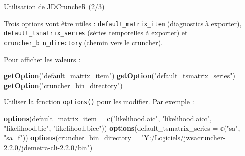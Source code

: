 \documentclass[10pt,xcolor=table,color={dvipsnames,usenames},ignorenonframetext,usepdftitle=false,french]{beamer}
\newenvironment{Shaded}{\begin{snugshade}}{\end{snugshade}}
\newcommand{\DataTypeTok}[1]{\textcolor[rgb]{0.13,0.29,0.53}{#1}}
\newcommand{\KeywordTok}[1]{\textcolor[rgb]{0.13,0.29,0.53}{\textbf{#1}}}
\newcommand{\NormalTok}[1]{#1}
\newcommand{\StringTok}[1]{\textcolor[rgb]{0.31,0.60,0.02}{#1}}
\begin{document}
\begin{frame}[fragile]{Utilisation de JDCruncheR (2/3)}
\protect\hypertarget{utilisation-de-jdcruncher-23}{}

Trois options vont être utiles : \texttt{default\_matrix\_item}
(diagnostics à exporter), \texttt{default\_tsmatrix\_series} (séries
temporelles à exporter) et \texttt{cruncher\_bin\_directory} (chemin
vers le cruncher).

Pour afficher les valeurs :

\begin{Shaded}
\begin{Highlighting}[]
\KeywordTok{getOption}\NormalTok{(}\StringTok{"default_matrix_item"}\NormalTok{)}
\KeywordTok{getOption}\NormalTok{(}\StringTok{"default_tsmatrix_series"}\NormalTok{)}
\KeywordTok{getOption}\NormalTok{(}\StringTok{"cruncher_bin_directory"}\NormalTok{)}
\end{Highlighting}
\end{Shaded}

Utiliser la fonction \texttt{options()} pour les modifier. Par exemple :

\begin{Shaded}
\begin{Highlighting}[]
\KeywordTok{options}\NormalTok{(}\DataTypeTok{default_matrix_item =} \KeywordTok{c}\NormalTok{(}\StringTok{"likelihood.aic"}\NormalTok{,}
                                \StringTok{"likelihood.aicc"}\NormalTok{,}
                                \StringTok{"likelihood.bic"}\NormalTok{,}
                                \StringTok{"likelihood.bicc"}\NormalTok{))}
\KeywordTok{options}\NormalTok{(}\DataTypeTok{default_tsmatrix_series =} \KeywordTok{c}\NormalTok{(}\StringTok{"sa"}\NormalTok{, }\StringTok{"sa_f"}\NormalTok{))}
\KeywordTok{options}\NormalTok{(}\DataTypeTok{cruncher_bin_directory =}
            \StringTok{"Y:/Logiciels/jwsacruncher-2.2.0/jdemetra-cli-2.2.0/bin"}\NormalTok{)}
\end{Highlighting}
\end{Shaded}

\end{frame}
\end{document}
